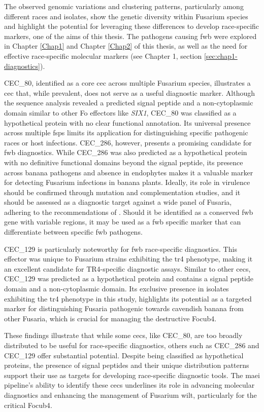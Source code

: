 The observed genomic variations and clustering patterns, particularly among different races and isolates, show the genetic diversity within Fusarium species and highlight the potential for leveraging these differences to develop race-specific markers, one of the aims of this thesis. The pathogens causing \ac{fwb} were explored in Chapter \ref{Chap1} and Chapter \ref{Chap2} of this thesis, as well as the need for effective race-specific molecular markers (see Chapter 1, section \ref{sec:chap1-diagnostics}).

CEC\_80, identified as a core \ac{cec} across multiple Fusarium species, illustrates a \ac{cec} that, while prevalent, does not serve as a useful diagnostic marker. Although the sequence analysis revealed a predicted signal peptide and a non-cytoplasmic domain similar to other \ac{Fo} effectors like \textit{SIX1}, CEC\_80 was classified as a hypothetical protein with no clear functional annotation. Its universal presence across multiple \acp{fsp} limits its application for distinguishing specific pathogenic races or host infections. CEC\_286, however, presents a promising candidate for \ac{fwb} diagnostics. While CEC\_286 was also predicted as a hypothetical protein with no definitive functional domains beyond the signal peptide, its presence across banana pathogens and absence in endophytes makes it a valuable marker for detecting Fusarium infections in banana plants. Ideally, its role in virulence should be confirmed through mutation and complementation studies, and it should be assessed as a diagnostic target against a wide panel of Fusaria, adhering to the recommendations of \textcite{Magdama2019}. Should it be identified as a conserved \ac{fwb} gene with variable regions, it may be used as a \ac{fwb} specific marker that can differentiate between specific \ac{fwb} pathogens. 

CEC\_129 is particularly noteworthy for \ac{fwb} race-specific diagnostics. This effector was unique to Fusarium strains exhibiting the \ac{tr4} phenotype, making it an excellent candidate for TR4-specific diagnostic assays. Similar to other \acp{cec}, CEC\_129 was predicted as a hypothetical protein and contains a signal peptide domain and a non-cytoplasmic domain. Its exclusive presence in isolates exhibiting the \ac{tr4} phenotype in this study, highlights its potential as a targeted marker for distinguishing Fusaria pathogenic towards cavendish banana from other Fusaria, which is crucial for managing the destructive \ac{Focub4}.

These findings illustrate that while some \acp{cec}, like CEC\_80, are too broadly distributed to be useful for race-specific diagnostics, others such as CEC\_286 and CEC\_129 offer substantial potential. Despite being classified as hypothetical proteins, the presence of signal peptides and their unique distribution patterns support their use as targets for developing race-specific diagnostic tools. The \ac{maei} pipeline's ability to identify these \acp{cec} underlines its role in advancing molecular diagnostics and enhancing the management of Fusarium wilt, particularly for the critical \ac{Focub4}.

